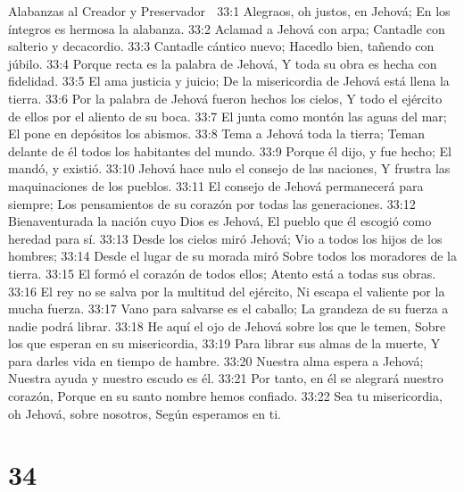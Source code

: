 Alabanzas al Creador y Preservador 

33:1 Alegraos, oh justos, en Jehová; 
En los íntegros es hermosa la alabanza. 
33:2 Aclamad a Jehová con arpa; 
Cantadle con salterio y decacordio. 
33:3 Cantadle cántico nuevo; 
Hacedlo bien, tañendo con júbilo. 
33:4 Porque recta es la palabra de Jehová, 
Y toda su obra es hecha con fidelidad. 
33:5 El ama justicia y juicio; 
De la misericordia de Jehová está llena la tierra. 
33:6 Por la palabra de Jehová fueron hechos los cielos, 
Y todo el ejército de ellos por el aliento de su boca. 
33:7 El junta como montón las aguas del mar; 
El pone en depósitos los abismos. 
33:8 Tema a Jehová toda la tierra; 
Teman delante de él todos los habitantes del mundo. 
33:9 Porque él dijo, y fue hecho; 
El mandó, y existió. 
33:10 Jehová hace nulo el consejo de las naciones, 
Y frustra las maquinaciones de los pueblos. 
33:11 El consejo de Jehová permanecerá para siempre; 
Los pensamientos de su corazón por todas las generaciones. 
33:12 Bienaventurada la nación cuyo Dios es Jehová, 
El pueblo que él escogió como heredad para sí. 
33:13 Desde los cielos miró Jehová; 
Vio a todos los hijos de los hombres; 
33:14 Desde el lugar de su morada miró 
Sobre todos los moradores de la tierra. 
33:15 El formó el corazón de todos ellos; 
Atento está a todas sus obras. 
33:16 El rey no se salva por la multitud del ejército, 
Ni escapa el valiente por la mucha fuerza. 
33:17 Vano para salvarse es el caballo; 
La grandeza de su fuerza a nadie podrá librar. 
33:18 He aquí el ojo de Jehová sobre los que le temen, 
Sobre los que esperan en su misericordia, 
33:19 Para librar sus almas de la muerte, 
Y para darles vida en tiempo de hambre. 
33:20 Nuestra alma espera a Jehová; 
Nuestra ayuda y nuestro escudo es él. 
33:21 Por tanto, en él se alegrará nuestro corazón, 
Porque en su santo nombre hemos confiado. 
33:22 Sea tu misericordia, oh Jehová, sobre nosotros, 
Según esperamos en ti. 

\chapter{34}

